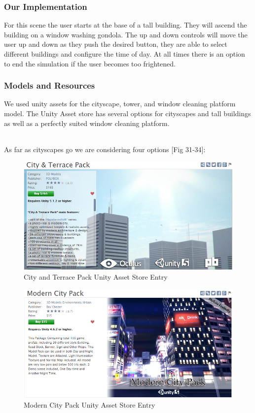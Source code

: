 \documentclass[a4paper,10pt]{article}
\begin{document}
\subsubsection{Our Implementation}
For this scene the user starts at the base of a tall building. They will ascend the building on a window washing gondola. The up and down controls will move the user up and down as they push the desired button, they are able to select different buildings and configure the time of day. At all times there is an option to end the simulation if the user becomes too frightened.

\subsubsection{Models and Resources}
We used unity assets for the cityscape, tower, and window cleaning platform model. The Unity Asset store has several options for cityscapes and tall buildings as well as a perfectly suited window cleaning platform.
\par~\\ 
As far as cityscapes go we are considering four options [Fig 31-34]:
\begin{figure}[H] %
	\centerline {\includegraphics[scale = 0.50]{cityAndTerracePack.png}}
	\caption{City and Terrace Pack Unity Asset Store Entry}
	\label{fig:cityAndTerracePack}
\end{figure}
\begin{figure}[H] %
	\centerline {\includegraphics[scale = 0.50]{modernCityPack.png}}
	\caption{Modern City Pack Unity Asset Store Entry}
	\label{fig:modernCityPack}
\end{figure}
\end{document}

